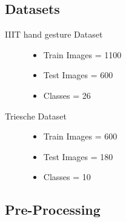 \documentclass[conference]{IEEEtran}
\begin{document}
\subsection{Datasets}
\begin{description}
\item[IIIT hand gesture Dataset] \hfill
\begin{itemize}
  \item Train Images = 1100
  \item Test Images = 600
  \item Classes = 26
\end{itemize}
\item[Triesche Dataset] \hfill
\begin{itemize}
  \item Train Images = 600
  \item Test Images = 180
  \item Classes = 10
\end{itemize}
\end{description}

\subsection{Pre-Processing}
\end{document}
